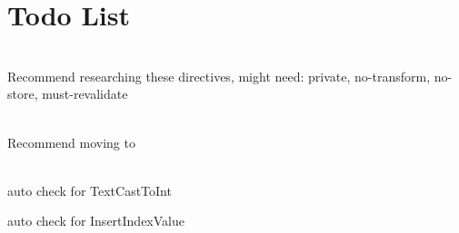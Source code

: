 \chapter{Todo List}
\hypertarget{todo}{}\label{todo}

\begin{DoxyRefList}
\item[Member \doxylink{namespace_code_igniter_1_1_h_t_t_p_a5fe5977d425ad8169db1df67a4f3d897}{Code\+Igniter\+::HTTP\+::no\+Cache} ()]\hfill \\
\label{todo__todo000010}%
%
Recommend researching these directives, might need\+: \textquotesingle{}private\textquotesingle{}, \textquotesingle{}no-\/transform\textquotesingle{}, \textquotesingle{}no-\/store\textquotesingle{}, \textquotesingle{}must-\/revalidate\textquotesingle{} 
\item[Member \doxylink{namespace_code_igniter_1_1_h_t_t_p_a23a6a1fbd26370582d89a73ec69f564f}{Code\+Igniter\+::HTTP\+::set\+Link} (\doxylink{interface_code_igniter_1_1_pager_1_1_pager_interface}{Pager\+Interface} \$pager)]\hfill \\
\label{todo__todo000009}%
%
Recommend moving to   
\item[Class \doxylink{class_code_igniter_1_1_database_1_1_s_q_l_s_r_v_1_1_builder}{Code\+Igniter\textbackslash{}Database\textbackslash{}SQLSRV\textbackslash{}Builder} ]\hfill \\
\label{todo__todo000002}%
%
auto check for Text\+Cast\+To\+Int 



auto check for Insert\+Index\+Value 




\end{DoxyRefList}
